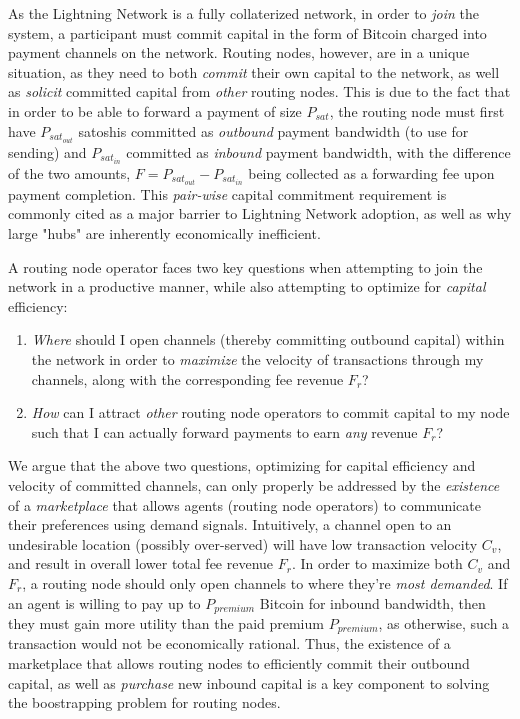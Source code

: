 \documentclass[10pt,a4paper]{article}
\theoremstyle{definition}
\begin{document}
As the Lightning Network is a fully collaterized network, in order to
\emph{join} the system, a participant must commit capital in the form of
Bitcoin charged into payment channels on the network. Routing nodes, however, are
in a unique situation, as they need to both \emph{commit} their own capital to
the network, as well as \emph{solicit} committed capital from \emph{other}
routing nodes. This is due to the fact that in order to be able to forward a
payment of size $P_{sat}$, the routing node must first have $P_{sat_{out}}$
satoshis committed as \emph{outbound} payment bandwidth (to use for sending)
and $P_{sat_{in}}$ committed as \emph{inbound} payment bandwidth, with the
difference of the two amounts, $F= P_{sat_{out}} -  P_{sat_{in}}$ being collected
as a forwarding fee upon payment completion. This \emph{pair-wise} capital
commitment requirement is commonly cited as a major barrier to Lightning
Network adoption, as well as why large "hubs" are inherently
economically inefficient.

A routing node operator faces two key questions when attempting to join the
network in a productive manner, while also attempting to optimize for
\emph{capital} efficiency:

\begin{enumerate}
        \item \emph{Where} should I open channels (thereby committing outbound
            capital) within the network in order to \emph{maximize} the
            velocity of transactions through my channels, along with the
            corresponding fee revenue $F_r$?

        \item \emph{How} can I attract \emph{other} routing node operators to
            commit capital to my node such that I can actually forward payments
            to earn \emph{any} revenue $F_r$?
\end{enumerate}

We argue that the above two questions, optimizing for capital efficiency and
velocity of committed channels, can only properly be addressed by the
\emph{existence} of a \emph{marketplace} that allows agents (routing node
operators) to communicate their preferences using demand signals. Intuitively,
a channel open to an undesirable location (possibly over-served) will have low
transaction velocity $C_{v}$, and result in overall lower total fee revenue
$F_r$. In order to maximize both $C_v$ and $F_r$, a routing node should only
open channels to where they're \emph{most demanded}. If an agent is willing to
pay up to $P_{premium}$ Bitcoin for inbound bandwidth, then they must gain more
utility than the paid premium $P_{premium}$, as otherwise, such a transaction
would not be economically rational. Thus, the existence of a marketplace that
allows routing nodes to efficiently commit their outbound capital, as well as
\emph{purchase} new inbound capital is a key component to solving the
boostrapping problem for routing nodes.
\end{document}
